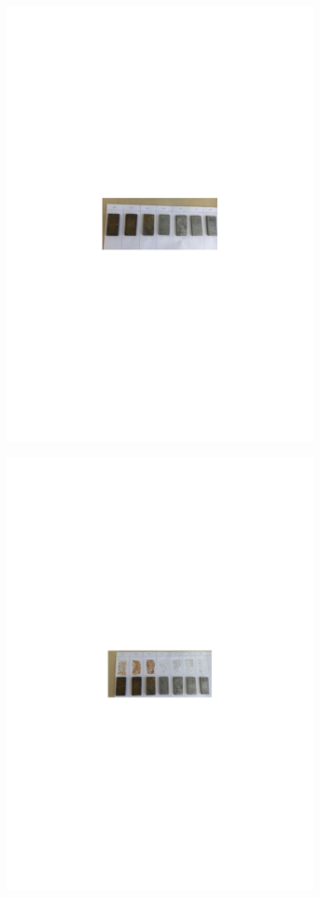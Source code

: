 \begin{figure}[H]
	\centering
	\includegraphics[width=0.8\textwidth]{media/gor/image25}
	\caption*{}
\end{figure}


\begin{figure}[H]
	\centering
	\includegraphics[width=0.8\textwidth]{media/gor/image26}
	\caption*{}
\end{figure}


